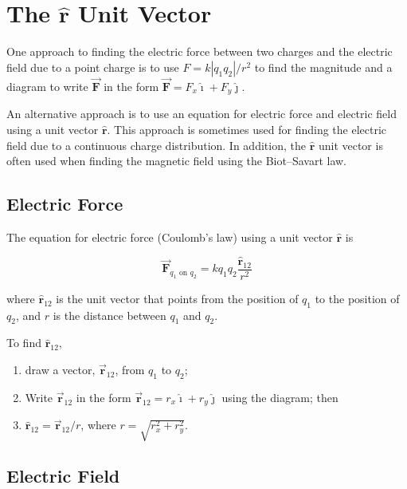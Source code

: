 \documentclass{article}
\newcommand{\ihat}[0]{\hat{\boldsymbol{\imath}}}
\newcommand{\jhat}[0]{\hat{\boldsymbol{\jmath}}}
\newcommand{\rhat}[0]{\hat{\mathbf{r}}}
\newcommand{\bfvec}[1]{\vec{\mathbf{#1}}}
\begin{document}

\section{The $\rhat$ Unit Vector}

One approach to finding the electric force between two charges and the electric field due to a point charge is to use
$F=k{|q_1q_2|}/{r^2}$ to find the magnitude and a diagram to write $\bfvec{F}$ in the form $\bfvec{F}=F_x\ihat + F_y\jhat$.

An alternative approach is to use an equation for electric force and electric field using a unit vector $\rhat$. This approach is sometimes used for finding the electric field due to a continuous charge distribution. In addition, the $\rhat$ unit vector is often used when finding the magnetic field using the Biot--Savart law.

\subsection{Electric Force}

The equation for electric force (Coulomb's law) using a unit vector $\rhat$ is

$$\bfvec{F}_{q_1\text{ on }q_2}=kq_1q_2\frac{\rhat_{12}}{r^2}$$

where $\rhat_{12}$ is the unit vector that points from the position of $q_1$ to the position of $q_2$, and $r$ is the distance between $q_1$ and $q_2$.

To find $\rhat_{12}$,

\begin{enumerate}

  \item draw a vector, $\bfvec{r}_{12}$, from $q_1$ to $q_2$;

  \item Write $\bfvec{r}_{12}$ in the form $\bfvec{r}_{12}=r_x\ihat+r_y\jhat$ using the diagram; then

  \item $\rhat_{12}=\bfvec{r}_{12}/r$, where $r=\sqrt{r_x^2+r_y^2}$.

\end{enumerate}

\subsection{Electric Field}
\end{document}
